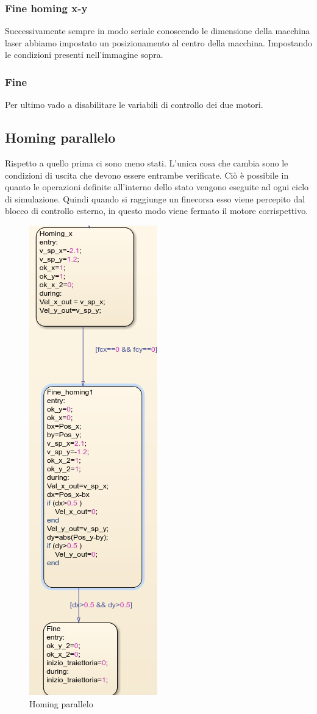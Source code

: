 \documentclass{article}
\begin{document}
\subsubsection{Fine homing x-y}

Successivamente sempre in modo seriale conoscendo le dimensione della macchina laser abbiamo impostato un posizionamento al centro della macchina. Impostando le condizioni presenti nell'immagine sopra.
\subsubsection{Fine}
Per ultimo vado a disabilitare le variabili di controllo dei due motori.

\subsection{Homing parallelo}
Rispetto a quello prima ci sono meno stati. L'unica cosa che cambia sono le condizioni di uscita che devono essere entrambe verificate. Ciò è possibile in quanto le operazioni definite all'interno dello stato vengono eseguite ad ogni ciclo di simulazione. Quindi quando si raggiunge un finecorsa esso viene percepito dal blocco di controllo esterno, in questo modo viene fermato il motore corrispettivo.

\begin{figure}[H]
\centering
\includegraphics[width=.3\textwidth]{./stateflow/homingparallel.png}
\caption{Homing parallelo}
\end{figure}
\end{document}
